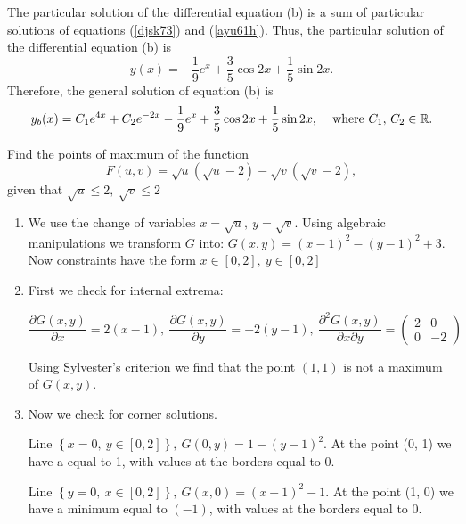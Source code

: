 \documentclass[addpoints]{exam} %
\begin{document}
\begin{questions}
\begin{parts}
\begin{solution}
  The particular solution of the differential equation (b) is a sum of particular solutions of equations (\ref{djsk73}) and (\ref{ayu61h}). Thus, the particular solution of the differential equation (b) is
  \[
      y(x) = -\frac{1}{9} e^x + \frac{3}{5} \cos 2x + \frac{1}{5} \sin 2x \text{.}
  \]
  Therefore, the general solution of equation (b) is
  \[
      y_b(x) = {C_1}{e^{4x}} + {C_2}{e^{ - 2x}} -\frac{1}{9} e^x + \frac{3}{5} \cos 2x + \frac{1}{5} \sin 2x \text{, \quad where $C_1, \, C_2 \in \mathbb{R}$.}
  \]
\end{solution}


\end{parts}





\question[10] Find the points of maximum of the function
\[
F\left(u,v\right)=\sqrt{u}\left(\sqrt{u}-2\right)-\sqrt{v}\left(\sqrt{v}-2\right),
\]
given that  $\sqrt{u}\le 2,\ \sqrt{v}\le 2$


\begin{solution}
  \begin{enumerate}
  \item  We use the change of variables $x=\sqrt{u},\ y=\sqrt{v}$. Using algebraic manipulations we transform $G$ into: $G\left(x,y\right)={\left(x-1\right)}^2-{\left(y-1\right)}^2+3$. Now constraints have the form $x\in \left[0,2\right],\ y\in \left[0,2\right]$

  \item  First we check for internal extrema:

  \[\frac{\partial G\left(x,y\right)}{\partial x}=2\left(x-1\right),\ \frac{\partial G\left(x,y\right)}{\partial y}=-2\left(y-1\right),\ \frac{{\partial }^2G\left(x,y\right)}{\partial x\partial y}=\left( \begin{array}{cc}
  2 & 0 \\
  0 & -2 \end{array}
  \right)\]


Using Sylvester's criterion we find that the point $(1,1)$ is not a maximum of $G(x,y)$.

\item  Now we check for corner solutions.

Line $\left\{x=0,\ y\in \left[0,2\right]\right\},\ G\left(0,y\right)=1-{\left(y-1\right)}^2$. At the point (0, 1) we have a \textbf{} equal to 1, with values at the borders equal to $0$.

Line $\left\{y=0,\ x\in \left[0,2\right]\right\},\ G\left(x,0\right)={\left(x-1\right)}^2-1$. At the point (1, 0) we have a minimum equal to $(-1)$, with values at the borders equal to 0.


\end{enumerate}
\end{solution}
\end{questions}
\end{document}
